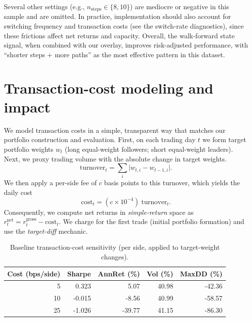 Several other settings (e.g., \(n_{\text{steps}}\in\{8,10\}\)) are mediocre or negative in this sample and are omitted. In practice, implementation should also account for switching frequency and transaction costs (see the switch-rate diagnostics), since these frictions affect net returns and capacity. Overall, the walk-forward state signal, when combined with our overlay, improves risk-adjusted performance, with “shorter steps + more paths” as the most effective pattern in this dataset.


\section{Transaction-cost modeling and impact}\label{sec:tc}

We model transaction costs in a simple, transparent way that matches our portfolio construction and evaluation. First, on each trading day \(t\) we form target portfolio weights \(w_t\) (long equal-weight followers; short equal-weight leaders). Next, we proxy trading volume with the absolute change in target weights.
\[
\text{turnover}_t = \sum_i \lvert w_{t,i} - w_{t-1,i}\rvert.
\]
We then apply a per-side fee of \(c\) basis points to this turnover, which yields the daily cost
\[
\text{cost}_t = (c\times 10^{-4})\;\text{turnover}_t.
\]
Consequently, we compute net returns in \emph{simple-return} space as
\(r^{\text{net}}_t = r^{\text{gross}}_t - \text{cost}_t\).
We charge for the first trade (initial portfolio formation) and use the \emph{target-diff} mechanic. %

\begin{table}
\caption{Baseline transaction-cost sensitivity (per side, applied to target-weight changes).}
\label{tab:baseline_tc}
\small
\centering
\begin{tabular}{rrrrr}
\toprule
Cost (bps/side) & Sharpe & AnnRet (\%) & Vol (\%) & MaxDD (\%) \\
\midrule
5   & 0.323  & 5.07   & 40.98 & -42.36 \\
10  & -0.015 & -8.56  & 40.99 & -58.57 \\
25  & -1.026 & -39.77 & 41.15 & -86.30 \\
\bottomrule
\end{tabular}
\end{table}

